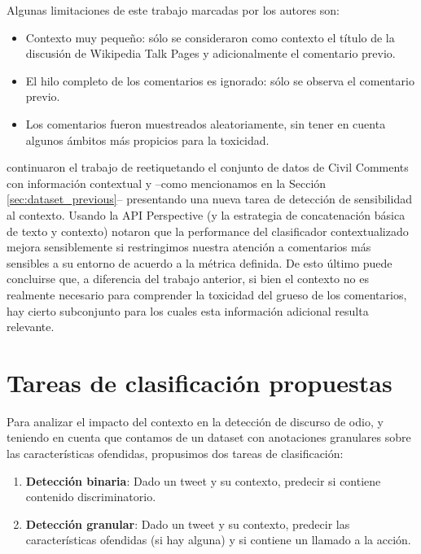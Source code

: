 Algunas limitaciones de este trabajo marcadas por los autores son:

\begin{itemize}
    \item Contexto muy pequeño: sólo se consideraron como contexto el título de la discusión de Wikipedia Talk Pages y adicionalmente el comentario previo.
    \item El hilo completo de los comentarios es ignorado: sólo se observa el comentario previo.
    \item Los comentarios fueron muestreados aleatoriamente, sin tener en cuenta algunos ámbitos más propicios para la toxicidad.
\end{itemize}

\citet{xenos-2021-context} continuaron el trabajo de \citet{pavlopoulos2020toxicity} reetiquetando el conjunto de datos de Civil Comments con información contextual y --como mencionamos en la Sección \ref{sec:dataset_previous}-- presentando una nueva tarea de detección de sensibilidad al contexto. Usando la API Perspective (y la estrategia de concatenación básica de texto y contexto) notaron que la performance del clasificador contextualizado mejora sensiblemente si restringimos nuestra atención a comentarios más sensibles a su entorno de acuerdo a la métrica definida. De esto último puede concluirse que, a diferencia del trabajo anterior, si bien  el contexto no es realmente necesario para comprender la toxicidad del grueso de los comentarios, hay cierto subconjunto para los cuales esta información adicional resulta relevante.


\section{Tareas de clasificación propuestas}
\label{sec:tasks}

Para analizar el impacto del contexto en la detección de discurso de odio, y teniendo en cuenta que contamos de un dataset con anotaciones granulares sobre las características ofendidas, propusimos dos tareas de clasificación:

\begin{enumerate}
    \item \textbf{Detección binaria}: Dado un tweet y su contexto, predecir si contiene contenido discriminatorio.
    \item \textbf{Detección granular}: Dado un tweet y su contexto, predecir las características ofendidas (si hay alguna) y si contiene un llamado a la acción.
\end{enumerate}

